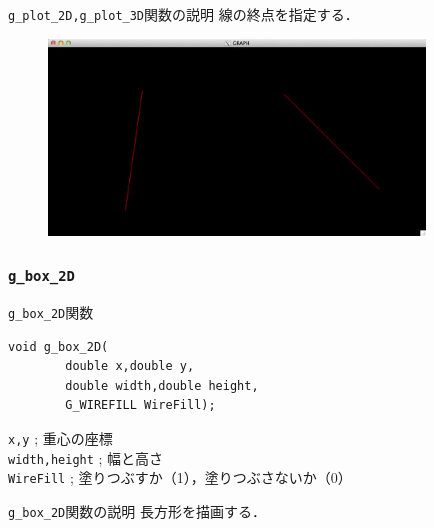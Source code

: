 \documentclass[a4paper,12pt]{jsarticle}%
\begin{document}
\begin{itembox}[l]{\texttt{g\_plot\_2D,g\_plot\_3D}関数の説明}
線の終点を指定する．
\end{itembox}

\begin{figure}[htb]
	\includegraphics[width=100mm]{./Figures/eps/Canvas_g_move_g_plot.eps}
\end{figure}




\clearpage
\subsubsection{\texttt{g\_box\_2D}}

\begin{itembox}[l]{\texttt{g\_box\_2D}関数}
\begin{verbatim}
void g_box_2D(
        double x,double y,
        double width,double height,
        G_WIREFILL WireFill);    
\end{verbatim}
\verb|x,y| ; 重心の座標\\
\verb|width,height| ; 幅と高さ\\
\verb|WireFill| ; 塗りつぶすか（1），塗りつぶさないか（0）\\
\end{itembox}

\begin{itembox}[l]{\texttt{g\_box\_2D}関数の説明}
長方形を描画する．
\end{itembox}


\end{document}
